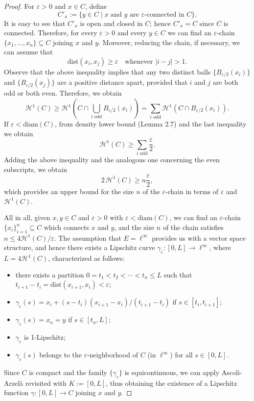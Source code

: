 \documentclass[12pt]{article}
\begin{document}
{\begin{proof}
    For $\varepsilon > 0$ and $x \in C$, define
    \[
        C'_x := \{y \in C \mid x \text{ and } y \text{ are } \varepsilon\text{-connected in } C\}.
    \]
    It is easy to see that $C'_x$ is open and closed in $C$; hence $C'_x = C$ since 
    $C$ is connected. Therefore, for every $\varepsilon > 0$ and every $y \in C$ we 
    can find an $\varepsilon$-chain $\{x_1, \ldots, x_n\} \subseteq C$ joining $x$ 
    and $y$. Moreover, reducing the chain, if necessary, we can assume that
    \[
        \mathrm{dist}(x_i, x_j) \geqslant \varepsilon \quad \text{whenever } |i - j| > 1.
    \]
    Observe that the above inequality implies that any two distinct balls 
    $\{B_{\varepsilon/2}(x_i)\}$ and $\{B_{\varepsilon/2}(x_j)\}$ are a positive 
    distance apart, provided that $i$ and $j$ are both odd or both even. Therefore, 
    we obtain
    \[
        \mathcal{H}^1(C) \geqslant \mathcal{H}^1\!\left(C \cap \bigcup_{i \text{ odd}} 
        B_{\varepsilon/2}(x_i)\right) = \sum_{i \text{ odd}} \mathcal{H}^1\!\left(C \cap 
        B_{\varepsilon/2}(x_i)\right).
    \]
    If $\varepsilon < \mathrm{diam}(C)$, from density lower bound (Lemma 2.7) and the last inequality we 
    obtain
    \[
        \mathcal{H}^1(C) \geqslant \sum_{i \text{ odd}} \frac{\varepsilon}{2}.
    \]
    Adding the above inequality and the analogous one concerning the even subscripts, 
    we obtain
    \[
        2\, \mathcal{H}^1(C) \geqslant n \frac{\varepsilon}{2},
    \]
    which provides an upper bound for the size $n$ of the $\varepsilon$-chain in 
    terms of $\varepsilon$ and $\mathcal{H}^1(C)$.

    All in all, given $x, y \in C$ and $\varepsilon > 0$ with $\varepsilon < 
    \mathrm{diam}(C)$, we can find an $\varepsilon$-chain $\{x_i\}_{i=1}^n \subseteq C$ 
    which connects $x$ and $y$, and the size $n$ of the chain satisfies 
    $n \leqslant 4\mathcal{H}^1(C)/\varepsilon$. The assumption that $E = \ell^\infty$ 
    provides us with a vector space structure, and hence there exists a Lipschitz 
    curve $\gamma_\varepsilon : [0, L] \to \ell^\infty$, where $L = 4\mathcal{H}^1(C)$, 
    characterized as follows:
    \begin{itemize}
        \item there exists a partition $0 = t_1 < t_2 < \cdots < t_n \leqslant L$ 
              such that $t_{i+1} - t_i = \mathrm{dist}(x_{i+1}, x_i) < \varepsilon$;
        \item $\gamma_\varepsilon(s) = x_i + (s - t_i)(x_{i+1} - x_i)/(t_{i+1} - t_i)$ 
              if $s \in [t_i, t_{i+1}]$;
        \item $\gamma_\varepsilon(s) = x_n = y$ if $s \in [t_n, L]$;
        \item $\gamma_\varepsilon$ is 1-Lipschitz;
        \item $\gamma_\varepsilon(s)$ belongs to the $\varepsilon$-neighborhood of 
              $C$ (in $\ell^\infty$) for all $s \in [0, L]$.
    \end{itemize}
    Since $C$ is compact and the family $\{\gamma_\varepsilon\}$ is equicontinuous, 
    we can apply Ascoli-Arzelà revisited with $K := [0, L]$, thus obtaining the existence of 
    a Lipschitz function $\gamma : [0, L] \to C$ joining $x$ and $y$.


\end{proof}}
\end{document}
